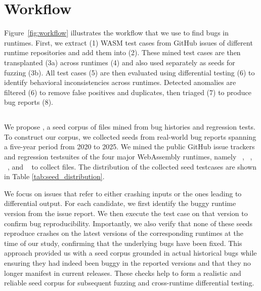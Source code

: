 \documentclass[lettersize,journal]{IEEEtran}
\begin{document}
\section{Workflow}
\label{sec:study_design}
\noindent Figure~\ref{fig:workflow} illustrates the workflow that we use to find bugs in \wasm{} runtimes. First, we extract (1) WASM test cases from GitHub issues of different runtime repositories and add them into \rtbench{} (2). These mined test cases are then transplanted (3a) across runtimes (4) and also used separately as seeds for fuzzing (3b). All  test cases (5) are then evaluated using differential testing (6) to identify behavioral inconsistencies across runtimes. Detected anomalies are filtered (6) to remove false positives and duplicates, then triaged (7) to produce bug reports (8).


\subsection{\tname{}}
\label{sec:rtbench}

We propose \tname{}, a seed corpus of \wasm{} files mined from bug histories and regression tests. To construct our corpus, we collected seeds from real-world bug reports spanning a five-year period from 2020 to 2025. We mined the public GitHub issue trackers and regression testsuites of the four major WebAssembly runtimes, namely \wasmtime{}~\cite{wasmtime}, \wasmer{}~\cite{wasmer}, \wamr{}~\cite{wamr}, and \wasmedge{}~\cite{wasmedge} to collect \rtbenchseedcount{} \wasm{} files. The distribution of the collected seed testcases are shown in Table \ref{tab:seed_distribution}.



We focus on issues that refer to either crashing inputs or the ones leading to differential output. For each candidate, we first identify the buggy runtime version from the issue report. We then execute the test case on that version to confirm bug reproducibility. Importantly, we also verify that none of these seeds reproduce crashes on the latest versions of the corresponding runtimes at the time of our study, confirming that the underlying bugs have been fixed. This approach provided us with a seed corpus grounded in actual historical bugs while ensuring they had indeed been buggy in the reported versions and that they no longer manifest in current releases. These checks help to form a realistic and reliable seed corpus for subsequent fuzzing and cross-runtime differential testing.
\end{document}
